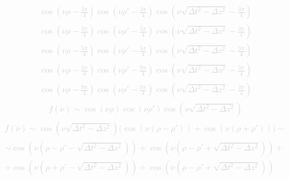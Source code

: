 %
\textcolor{lightgray} { \begin{equation*} \begin{aligned}
\cos \left( \nu \rho - \frac{3 \pi}{4} \right)
\cos \left( \nu \rho' - \frac{3 \pi}{4} \right)
\cos \left( \nu \sqrt{\Delta t^2 - \Delta z^2} - \frac{3\pi}{4} \right)
\end{aligned} \end{equation*} }
%
\textcolor{lightgray} { \begin{equation*} \begin{aligned}
\cos \left( \nu \rho - \frac{3 \pi}{4} \right)
\cos \left( \nu \rho' - \frac{5 \pi}{4} \right)
\cos \left( \nu \sqrt{\Delta t^2 - \Delta z^2} - \frac{3\pi}{4} \right)
\end{aligned} \end{equation*} }
%
\textcolor{lightgray} { \begin{equation*} \begin{aligned}
\cos \left( \nu \rho - \frac{5 \pi}{4} \right)
\cos \left( \nu \rho' - \frac{5 \pi}{4} \right)
\cos \left( \nu \sqrt{\Delta t^2 - \Delta z^2} - \frac{3\pi}{4} \right)
\end{aligned} \end{equation*} }
%
\textcolor{lightgray} { \begin{equation*} \begin{aligned}
\cos \left( \nu \rho - \frac{5 \pi}{4} \right)
\cos \left( \nu \rho' - \frac{9 \pi}{4} \right)
\cos \left( \nu \sqrt{\Delta t^2 - \Delta z^2} - \frac{3\pi}{4} \right)
\end{aligned} \end{equation*} }
%
\textcolor{lightgray} { \begin{equation*} \begin{aligned}
\cos \left( \nu \rho - \frac{9 \pi}{4} \right)
\cos \left( \nu \rho' - \frac{9 \pi}{4} \right)
\cos \left( \nu \sqrt{\Delta t^2 - \Delta z^2} - \frac{3\pi}{4} \right)
\end{aligned} \end{equation*} }
%
\textcolor{lightgray} { \begin{equation*} \begin{aligned}
f (\nu) \sim \cos \left( \nu \rho \right) \cos \left( \nu \rho' \right)
\cos \left( \nu \sqrt{\Delta t^2 - \Delta z^2} \right)
\end{aligned} \end{equation*} }
%
\textcolor{lightgray} { \begin{equation*} \begin{aligned}
f (\nu) \sim \cos \left( \nu \sqrt{\Delta t^2 - \Delta z^2} \right) \Big( 
\cos \left( \nu \left( \rho - \rho' \right) \right) +
\cos \left( \nu \left( \rho + \rho' \right) \right) \Big) \sim \\
\sim \cos \left( \nu \left( \rho - \rho' - 
\sqrt{\Delta t^2 - \Delta z^2} \right) \right) + 
\cos \left( \nu \left( \rho - \rho' + 
\sqrt{\Delta t^2 - \Delta z^2} \right) \right) + \\
+ \cos \left( \nu \left( \rho + \rho' - 
\sqrt{\Delta t^2 - \Delta z^2} \right) \right) +
\cos \left( \nu \left( \rho - \rho' + 
\sqrt{\Delta t^2 - \Delta z^2} \right) \right)
\end{aligned} \end{equation*} }
